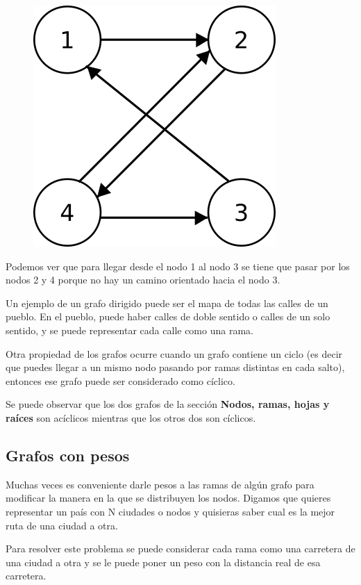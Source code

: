 \documentclass{article}
\begin{document}
\begin{figure}[H]
    \centering
    \includegraphics[width=0.15\paperwidth]{dirigido}
\end{figure}

Podemos ver que para llegar desde el nodo 1 al nodo 3 se tiene que pasar por los nodos 2 y 4 porque no hay un camino orientado hacia el nodo 3.

Un ejemplo de un grafo dirigido puede ser el mapa de todas las calles de un pueblo. En el pueblo, puede haber calles de doble sentido o calles de un solo sentido, y se puede representar cada calle como una rama.

Otra propiedad de los grafos ocurre cuando un grafo contiene un ciclo (es decir que puedes llegar a un mismo nodo pasando por ramas distintas en cada salto), entonces ese grafo puede ser considerado como cíclico.

Se puede observar que los dos grafos de la sección \textbf{Nodos, ramas, hojas y raíces} son acíclicos mientras que los otros dos son cíclicos.

\subsection{Grafos con pesos}

Muchas veces es conveniente darle pesos a las ramas de algún grafo para modificar la manera en la que se distribuyen los nodos. Digamos que quieres representar un país con N ciudades o nodos y quisieras saber cual es la mejor ruta de una ciudad a otra.

Para resolver este problema se puede considerar cada rama como una carretera de una ciudad a otra y se le puede poner un peso con la distancia real de esa carretera.
\end{document}
